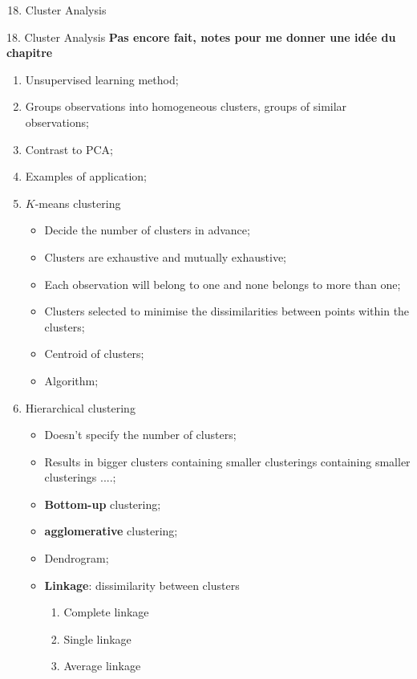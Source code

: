 \documentclass[12pt, titlepage, french]{report}
\begin{document}
\begin{ASM_chapter}
\begin{enumerate}
  \setcounter{enumi}{17}
	\item	Cluster Analysis
\end{enumerate}
\end{ASM_chapter}

\begin{CHPT_SUMM}{18. Cluster Analysis}
\textbf{Pas encore fait, notes pour me donner une idée du chapitre}
\begin{enumerate}
	\item[]	Unsupervised learning method;
	\item[]	Groups observations into homogeneous clusters, groups of similar observations;
	\item[]	Contrast to PCA;
	\item[]	Examples of application;
	\item	$K$-means clustering
	\begin{itemize}
		\item	Decide the number of clusters in advance;
		\item	Clusters are exhaustive and mutually exhaustive;
		\item[] Each observation will belong to one and none belongs to more than one;
		\item	Clusters selected to minimise the dissimilarities between points within the clusters;
		\item	Centroid of clusters;
		\item	Algorithm;
	\end{itemize}
	\item	Hierarchical clustering
	\begin{itemize}
		\item	Doesn't specify the number of clusters;
		\item	Results in bigger clusters containing smaller clusterings containing smaller clusterings ....;
		\item	\textbf{Bottom-up} clustering;
		\item	\textbf{agglomerative} clustering;
		\item	Dendrogram;
		\item	\textbf{Linkage}: dissimilarity between clusters
		\begin{enumerate}
			\item	Complete linkage
			\item	Single linkage
			\item	Average linkage

\end{enumerate}
\end{itemize}
\end{enumerate}
\end{CHPT_SUMM}
\end{document}
